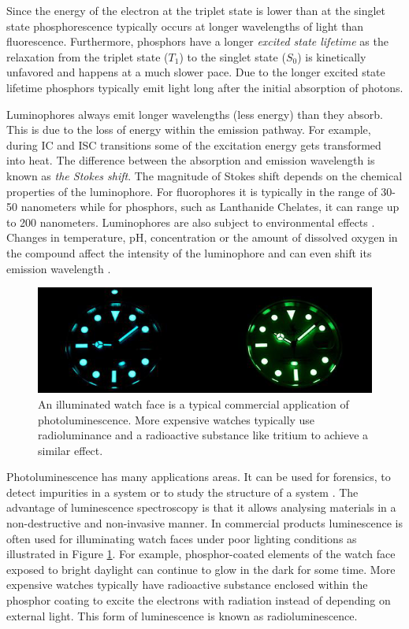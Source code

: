 \documentclass[thesis.tex]{subfiles}
\begin{document}
\noindent Since the energy of the electron at the triplet state is lower than at the singlet state phosphorescence typically occurs at longer wavelengths of light than fluorescence. Furthermore, phosphors have a longer \emph{excited state lifetime} as the relaxation from the triplet state ($T_1$) to the singlet state ($S_0$) is kinetically unfavored and happens at a much slower pace. Due to the longer excited state lifetime phosphors typically emit light long after the initial absorption of photons. \cite{CEJ}

Luminophores always emit longer wavelengths (less energy) than they absorb. This is due to the loss of energy within the emission pathway. For example, during IC and ISC transitions some of the excitation energy gets transformed into heat. The difference between the absorption and emission wavelength is known as \emph{the Stokes shift}. The magnitude of Stokes shift depends on the chemical properties of the luminophore. For fluorophores it is typically in the range of 30-50 nanometers while for phosphors, such as Lanthanide Chelates, it can range up to 200 nanometers. Luminophores are also subject to environmental effects \cite{hemmila}. Changes in temperature, pH, concentration or the amount of dissolved oxygen in the compound affect the intensity of the luminophore and can even shift its emission wavelength \cite{luminescence_basics}.

\begin{figure}[hb]
\centering \includegraphics[width=\textwidth]{images/photoluminescence_example}
\caption{An illuminated watch face is a typical commercial application of photoluminescence. More expensive watches typically use radioluminance and a radioactive substance like tritium to achieve a similar effect.\label{figure:photoluminescence_example}}
\end{figure}

Photoluminescence has many applications areas. It can be used for forensics, to detect impurities in a system or to study the structure of a system \cite{photoluminescence_use_case_2}\cite{photoluminescence_use_case_1}\cite{photoluminescence_use_case_3}. The advantage of luminescence spectroscopy is that it allows analysing materials in a non-destructive and non-invasive manner. In commercial products luminescence is often used for illuminating watch faces under poor lighting conditions as illustrated in Figure \ref{figure:photoluminescence_example}. For example, phosphor-coated elements of the watch face exposed to bright daylight can continue to glow in the dark for some time. More expensive watches typically have radioactive substance enclosed within the phosphor coating to excite the electrons with radiation instead of depending on external light. This form of luminescence is known as radioluminescence.
\end{document}
